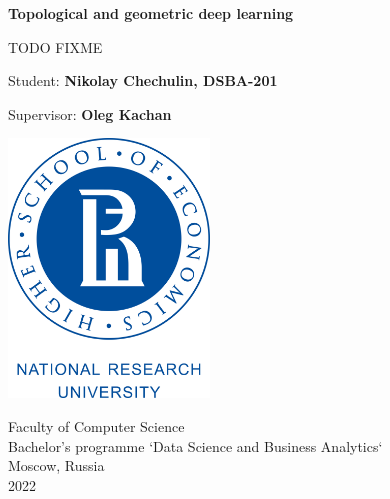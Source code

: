 \graphicspath{ {./assets/} }

\begin{titlepage}
   \begin{center}
        \vspace*{1cm}
        
        {\huge \textbf{Topological and geometric deep learning}}
        
        \vspace{0.5cm}
        {\large TODO FIXME }
        
        \vspace{1.5cm}
        
        {\large Student: \textbf{Nikolay Chechulin, DSBA-201}}

        {\large Supervisor: \textbf{Oleg Kachan}}
        
        \vfill
        \vspace{1.5cm}
        
        \includegraphics[width=0.4\textwidth]{Higher_School_of_Economics_Logo}
        
        Faculty of Computer Science\\            
        Bachelor's programme `Data Science and Business Analytics`\\
        Moscow, Russia\\
        2022
            
   \end{center}
\end{titlepage}
